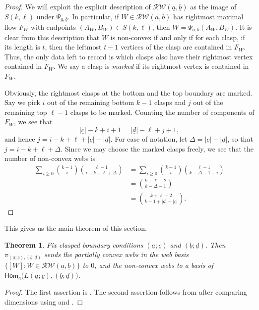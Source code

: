 \documentclass[11pt,a4paper,reqno]{amsart}
\newcommand{\g}{\mathfrak{g}}
\newcommand{\proj}{\pi_{(\underline a;\underline c),(\underline b;\underline d)}}
\renewcommand{\a}{\alpha}
\renewcommand{\b}{\mathfrak{b}}
\numberwithin{equation}{section}
\renewcommand{\hom}{\mathsf{Hom}}
\renewcommand{\a}{\underline a}
\renewcommand{\b}{\underline b}
\newcommand{\RW}{\mathcal{RW}}
\newtheorem{thm}{Theorem}[section]
\theoremstyle{definition}
\theoremstyle{remark}
\begin{document}
\begin{proof}
    We will exploit the explicit description of $\RW(\a,\b)$ as the image of $S(k,\ell)$ under $\Psi_{\a,\b}$. In particular, if $W\in \RW(\a,\b)$ has rightmost maximal flow $F_W$ with endpoints $(A_W, B_W)\in S(k,\ell)$, then $W = \Psi_{\a,\b}(A_W,B_W)$. It is clear from this description that $W$ is non-convex if and only if for each clasp, if its length is $t$, then the leftmost $t-1$ vertices of the clasp are contained in $F_W$. Thus, the only data left to record is which clasps also have their rightmost vertex contained in $F_W$. We say a clasp is \emph{marked} if its rightmost vertex is contained in $F_W$.
    
    Obviously, the rightmost clasps at the bottom and the top boundary are marked. Say we pick $i$ out of the remaining bottom $k-1$ clasps and $j$ out of the remaining top $\ell-1$ clasps to be marked. Counting the number of components of $F_W$, we see that
    \[|\underline c|-k +i+1 = |\underline d|-\ell+j+1,\]
    and hence $j = i-k+\ell+|\underline c|-|\underline d|$. For ease of notation, let $\Delta = |\underline c|-|\underline d|$, so that $j=i-k+\ell + \Delta$. Since we may choose the marked clasps freely, we see that the number of non-convex webs is
    \begin{align*}
        \sum_{i\ge0}\binom{k-1}{i}\binom{\ell-1}{i-k+\ell+\Delta} &= \sum_{i\ge0}\binom{k-1}{i}\binom{\ell-1}{k-\Delta-1-i}\\
        &= \binom{k+\ell-2}{k-\Delta-1}\\
        &= \binom{k+\ell-2}{k-1+|\underline d|-|\underline c|}.
    \end{align*}    
\end{proof}

This gives us the main theorem of this section.

\begin{thm}\label{thm:clasped}
    Fix clasped boundary conditions $(\a;\underline c)$ and $(\b;\underline d)$. Then $\proj$ sends the partially convex webs in the web basis $\{[W]: W\in \RW(\a,\b)\}$ to $0$, and the non-convex webs to a basis of $\hom_\g\big(L(\a;\underline c), (\b;\underline d)\big)$.
\end{thm}

\begin{proof}
    The first assertion is . The second assertion follows from  after comparing dimensions using  and .
\end{proof}
\end{document}
